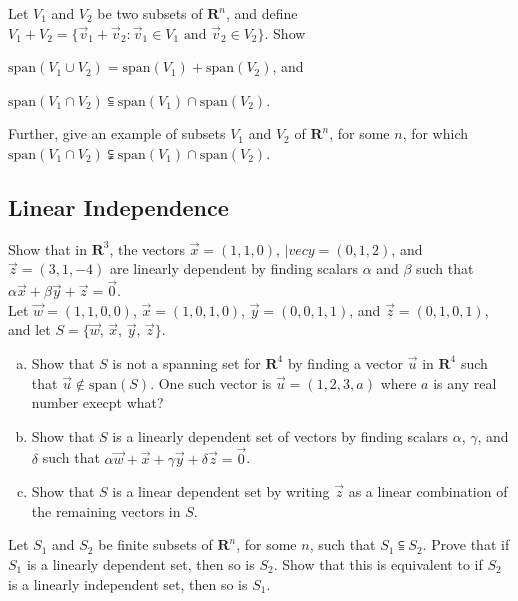 \documentclass[a4paper,11pt]{article}
\newcommand{\R}{\mathbf{R}}
\begin{document}
 Let $V_1$ and $V_2$ be two subsets of $\R^n$, and
define $V_1+V_2=\{\vec v_1 + \vec v_2 : \vec v_1 \in V_1 \text{ and } \vec v_2
\in V_2 \}$. Show
\begin{enumerate*}[(a)]
\item $\text{span}(V_1 \cup V_2) = \text{span}(V_1) + \text{span}(V_2)$, and
\item $\text{span}(V_1 \cap V_2) \subseteqq \text{span}(V_1) \cap
  \text{span}(V_2)$.
\end{enumerate*}
Further, give an example of subsets $V_1$ and $V_2$ of $\R^n$, for some $n$, for
which $\text{span}(V_1 \cap V_2) \subsetneqq \text{span}(V_1) \cap
\text{span}(V_2)$. \\

\subsection*{Linear Independence}

 Show that in $\R^3$, the vectors $\vec
x=(1,1,0)$, $|vec y=(0,1,2)$, and $\vec z=(3,1,-4)$ are linearly dependent by
finding scalars $\alpha$ and $\beta$ such that $\alpha\vec x+\beta\vec y+\vec
z=\vec 0$. \\

 Let $\vec w=(1,1,0,0)$, $\vec x=(1,0,1,0)$, $\vec
y=(0,0,1,1)$, and $\vec z=(0,1,0,1)$, and let $S=\{\vec w,\,\vec x,\,\vec
y,\,\vec z\}$.
\begin{enumerate}[(a)]
\item Show that $S$ is not a spanning set for $\R^4$ by finding a vector $\vec
  u$ in $\R^4$ such that $\vec u \notin\text{span}(S)$. One such vector is $\vec
  u=(1,2,3,a)$ where $a$ is any real number execpt what?
\item Show that $S$ is a linearly dependent set of vectors by finding scalars
  $\alpha$, $\gamma$, and $\delta$ such that $\alpha\vec w+\vec x+\gamma\vec
  y+\delta\vec z=\vec 0$.
\item Show that $S$ is a linear dependent set by writing $\vec z$ as a linear
  combination of the remaining vectors in $S$.
\end{enumerate}

 Let $S_1$ and $S_2$ be finite subsets of $\R^n$,
for some $n$, such that $S_1 \subseteqq S_2$. Prove that if $S_1$ is a linearly
dependent set, then so is $S_2$. Show that this is equivalent to if $S_2$ is a
linearly independent set, then so is $S_1$. \\
\end{document}
